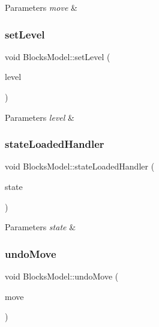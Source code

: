 \begin{DoxyParams}{Parameters}
{\em move} & \\
\hline
\end{DoxyParams}
\mbox{\label{class_blocks_model_aa5ca46eacee24fe51864845ecf6a1266}} 
\subsubsection{\texorpdfstring{setLevel}{setLevel}}
{\footnotesize\ttfamily void Blocks\+Model\+::set\+Level (\begin{DoxyParamCaption}\item[{const Game\+Level \&}]{level }\end{DoxyParamCaption})\hspace{0.3cm}{\ttfamily [slot]}}


\begin{DoxyParams}{Parameters}
{\em level} & \\
\hline
\end{DoxyParams}
\mbox{\label{class_blocks_model_a9fc884d31e972c84e2e3dcbce73b8377}} 
\subsubsection{\texorpdfstring{stateLoadedHandler}{stateLoadedHandler}}
{\footnotesize\ttfamily void Blocks\+Model\+::state\+Loaded\+Handler (\begin{DoxyParamCaption}\item[{const \mbox{\hyperlink{struct_load_state}{Load\+State}} \&}]{state }\end{DoxyParamCaption})\hspace{0.3cm}{\ttfamily [slot]}}


\begin{DoxyParams}{Parameters}
{\em state} & \\
\hline
\end{DoxyParams}
\mbox{\label{class_blocks_model_a6707a7dac44d269c2d52e7904a7473ef}} 
\subsubsection{\texorpdfstring{undoMove}{undoMove}}
{\footnotesize\ttfamily void Blocks\+Model\+::undo\+Move (\begin{DoxyParamCaption}\item[{const std\+::shared\+\_\+ptr$<$ \mbox{\hyperlink{struct_move}{Move}} $>$ \&}]{move }\end{DoxyParamCaption})\hspace{0.3cm}{\ttfamily [slot]}}


